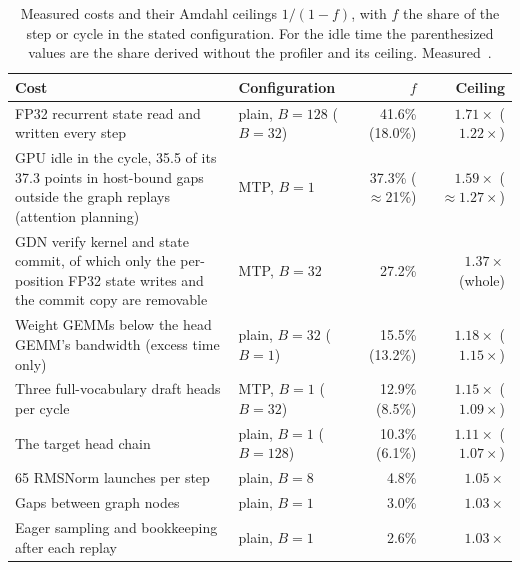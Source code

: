 \begin{table}[htbp]
\tablefont\centering
\caption{Measured costs and their Amdahl ceilings $1/(1-f)$, with $f$ the share of the step or cycle in the stated configuration. For the idle time the parenthesized values are the share derived without the profiler and its ceiling. Measured~.}
\label{tab:profile-ranked}
\vskip 0.05in
\begin{tabularx}{\linewidth}{@{}YP{3.1cm}rr@{}}\toprule
Cost & Configuration & $f$ & Ceiling\\\midrule
FP32 recurrent state read and written every step & plain, $B=128$ ($B=32$) & 41.6\% (18.0\%) & $1.71\times$ ($1.22\times$)\\
GPU idle in the cycle, 35.5 of its 37.3 points in host-bound gaps outside the graph replays (attention planning) & MTP, $B=1$ & 37.3\% ($\approx$21\%) & $1.59\times$ ($\approx1.27\times$)\\
GDN verify kernel and state commit, of which only the per-position FP32 state writes and the commit copy are removable & MTP, $B=32$ & 27.2\% & $1.37\times$ (whole)\\
Weight GEMMs below the head GEMM's bandwidth (excess time only) & plain, $B=32$ ($B=1$) & 15.5\% (13.2\%) & $1.18\times$ ($1.15\times$)\\
Three full-vocabulary draft heads per cycle & MTP, $B=1$ ($B=32$) & 12.9\% (8.5\%) & $1.15\times$ ($1.09\times$)\\
The target head chain & plain, $B=1$ ($B=128$) & 10.3\% (6.1\%) & $1.11\times$ ($1.07\times$)\\
65 RMSNorm launches per step & plain, $B=8$ & 4.8\% & $1.05\times$\\
Gaps between graph nodes & plain, $B=1$ & 3.0\% & $1.03\times$\\
Eager sampling and bookkeeping after each replay & plain, $B=1$ & 2.6\% & $1.03\times$\\\bottomrule
\end{tabularx}
\end{table}

